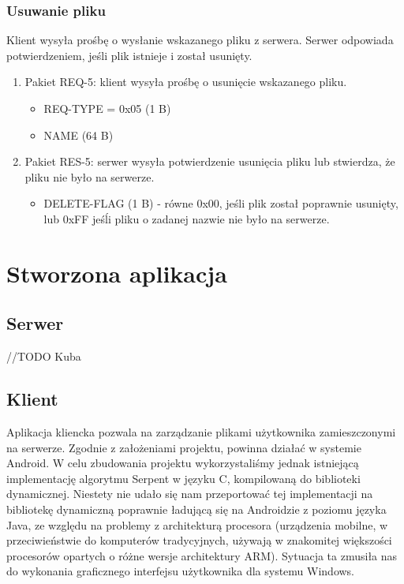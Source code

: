 \documentclass{article}
\begin{document}
	\subsubsection{Usuwanie pliku}
	Klient wysyła prośbę o wysłanie wskazanego pliku z serwera. Serwer odpowiada potwierdzeniem, jeśli plik istnieje i został usunięty. 
	\begin{enumerate}
		\item Pakiet REQ-5: klient wysyła prośbę o usunięcie wskazanego pliku. 
		\begin{itemize}
			\item REQ-TYPE = 0x05 (1 B)
			\item NAME (64 B)
		\end{itemize}
	
		\item Pakiet RES-5: serwer wysyła potwierdzenie usunięcia pliku lub stwierdza, że pliku nie było na serwerze. 
		\begin{itemize}
			\item DELETE-FLAG (1 B) - równe 0x00, jeśli plik został poprawnie usunięty, lub 0xFF jeśĺi pliku o zadanej nazwie nie było na serwerze. 
		\end{itemize}
		
	\end{enumerate}
		

	\section{Stworzona aplikacja}
	
	\subsection{Serwer}
	
	//TODO Kuba
	
	\subsection{Klient}
	Aplikacja kliencka pozwala na zarządzanie plikami użytkownika zamieszczonymi na serwerze. Zgodnie z założeniami projektu, powinna działać w systemie Android. W celu zbudowania projektu wykorzystaliśmy jednak istniejącą implementację algorytmu Serpent w języku C, kompilowaną do biblioteki dynamicznej. Niestety nie udało się nam przeportować tej implementacji na bibliotekę dynamiczną poprawnie ładującą się na Androidzie z poziomu języka Java, ze względu na problemy z architekturą procesora (urządzenia mobilne, w przeciwieństwie do komputerów tradycyjnych, używają w znakomitej większości procesorów opartych o różne wersje architektury ARM). Sytuacja ta zmusiła nas do wykonania graficznego interfejsu użytkownika dla systemu Windows. 
	
\end{document}
